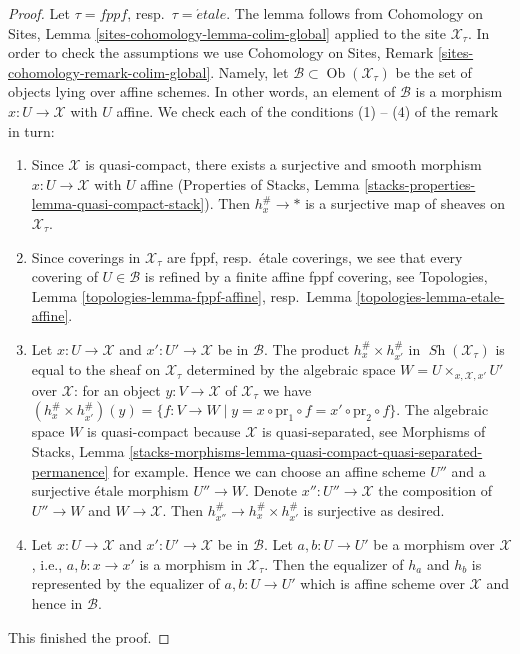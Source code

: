 \documentclass[10pt,a4paper]{amsart}
\theoremstyle{plain}
\theoremstyle{definition}
\theoremstyle{remark}
\numberwithin{equation}{subsection}
\def\Ob{\mathop{\mathrm{Ob}}\nolimits}
\def\Sh{\mathop{\mathit{Sh}}\nolimits}
\def\etale{{\acute{e}tale}}
\begin{document}
\begin{proof}
Let $\tau = fppf$, resp.\ $\tau = \etale$. The lemma follows from
Cohomology on Sites, Lemma \ref{sites-cohomology-lemma-colim-global}
applied to the site $\mathcal{X}_\tau$. In order to check the assumptions we
use Cohomology on Sites, Remark \ref{sites-cohomology-remark-colim-global}.
Namely, let $\mathcal{B} \subset \Ob(\mathcal{X}_\tau)$ be the set
of objects lying over affine schemes. In other words, an element
of $\mathcal{B}$ is a morphism $x : U \to \mathcal{X}$ with $U$ affine.
We check each of the conditions (1) -- (4) of the remark in turn:
\begin{enumerate}
\item Since $\mathcal{X}$ is quasi-compact, there exists a
surjective and smooth morphism $x : U \to \mathcal{X}$ with $U$ affine
(Properties of Stacks, Lemma
\ref{stacks-properties-lemma-quasi-compact-stack}).
Then $h_x^\# \to *$ is a surjective map of sheaves on $\mathcal{X}_\tau$.
\item Since coverings in $\mathcal{X}_\tau$ are fppf, resp.\ \'etale
coverings, we see that every covering of $U \in \mathcal{B}$ is refined
by a finite affine fppf covering, see
Topologies, Lemma \ref{topologies-lemma-fppf-affine},
resp.\ Lemma \ref{topologies-lemma-etale-affine}.
\item Let $x : U \to \mathcal{X}$ and $x' : U' \to \mathcal{X}$ be
in $\mathcal{B}$. The product $h_x^\# \times h_{x'}^\#$ in
$\Sh(\mathcal{X}_\tau)$ is equal to the sheaf on $\mathcal{X}_\tau$
determined by the algebraic space $W = U \times_{x, \mathcal{X}, x'} U'$ over
$\mathcal{X}$: for an object $y : V \to \mathcal{X}$ of
$\mathcal{X}_\tau$ we have
$(h_x^\# \times h_{x'}^\#)(y) = \{f : V \to W \mid y =
x \circ \text{pr}_1 \circ f = x' \circ \text{pr}_2 \circ f\}$.
The algebraic space $W$ is quasi-compact because $\mathcal{X}$
is quasi-separated, see Morphisms of Stacks, Lemma
\ref{stacks-morphisms-lemma-quasi-compact-quasi-separated-permanence}
for example. Hence we can choose an affine scheme $U''$ and
a surjective \'etale morphism $U'' \to W$. Denote $x'' : U'' \to \mathcal{X}$
the composition of $U'' \to W$ and $W \to \mathcal{X}$. Then
$h_{x''}^\# \to h_x^\# \times h_{x'}^\#$ is surjective as desired.
\item Let $x : U \to \mathcal{X}$ and $x' : U' \to \mathcal{X}$ be
in $\mathcal{B}$. Let $a, b : U \to U'$ be a morphism over $\mathcal{X}$,
i.e., $a, b  : x \to x'$ is a morphism in $\mathcal{X}_\tau$.
Then the equalizer of $h_a$ and $h_b$ is represented by the
equalizer of $a, b : U \to U'$ which is
affine scheme over $\mathcal{X}$ and hence in $\mathcal{B}$.
\end{enumerate}
This finished the proof.
\end{proof}
\end{document}
